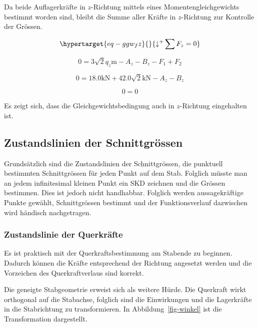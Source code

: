\documentclass[
  12pt,
  letterpaper,
  DIV=11,
  egregdoesnotlikesansseriftitles]{scrartcl}
\begin{document}
Da beide Auflagerkräfte in \(z\)-Richtung mittels eines
Momentengleichgewichts bestimmt worden sind, bleibt die Summe aller
Kräfte in \(z\)-Richtung zur Kontrolle der Grössen.

\begin{equation}\protect\hypertarget{eq-ggw_fz}{}{
{\downarrow^+}\sum F_z = 0
}\label{eq-ggw_fz}\end{equation}

\begin{equation}0 = 3 \sqrt{2} q_{z} \text{m} - A_{z} - B_{z} - F_{1} + F_{2}\end{equation}

\begin{equation}0 = 18.0 \text{k} \text{N} + 42.0 \sqrt{2} \text{k} \text{N} - A_{z} - B_{z}\end{equation}

\begin{equation}0 = 0\end{equation}

Es zeigt sich, dass die Gleichgewichtsbedingung auch in \(z\)-Richtung
eingehalten ist.

\hypertarget{zustandslinien-der-schnittgruxf6ssen}{%
\subsection{Zustandslinien der
Schnittgrössen}\label{zustandslinien-der-schnittgruxf6ssen}}

Grundsätzlich sind die Zustandslinien der Schnittgrössen, die punktuell
bestimmten Schnittgrössen für jeden Punkt auf dem Stab. Folglich müsste
man an jedem infinitesimal kleinen Punkt ein SKD zeichnen und die
Grössen bestimmen. Dies ist jedoch nicht handhabbar. Folglich werden
aussagekräftige Punkte gewählt, Schnittgrössen bestimmt und der
Funktionsverlauf dazwischen wird händisch nachgetragen.

\hypertarget{zustandslinie-der-querkruxe4fte}{%
\subsubsection{Zustandslinie der
Querkräfte}\label{zustandslinie-der-querkruxe4fte}}

Es ist praktisch mit der Querkraftsbestimmung am Stabende zu beginnen.
Dadurch können die Kräfte entsprechend der Richtung angesetzt werden und
die Vorzeichen des Querkraftverlaus sind korrekt.

Die geneigte Stabgeometrie erweist sich als weitere Hürde. Die Querkraft
wirkt orthogonal auf die Stabachse, folglich sind die Einwirkungen und
die Lagerkräfte in die Stabrichtung zu transformieren. In
Abbildung~\ref{fig-winkel} ist die Transformation dargestellt.
\end{document}
